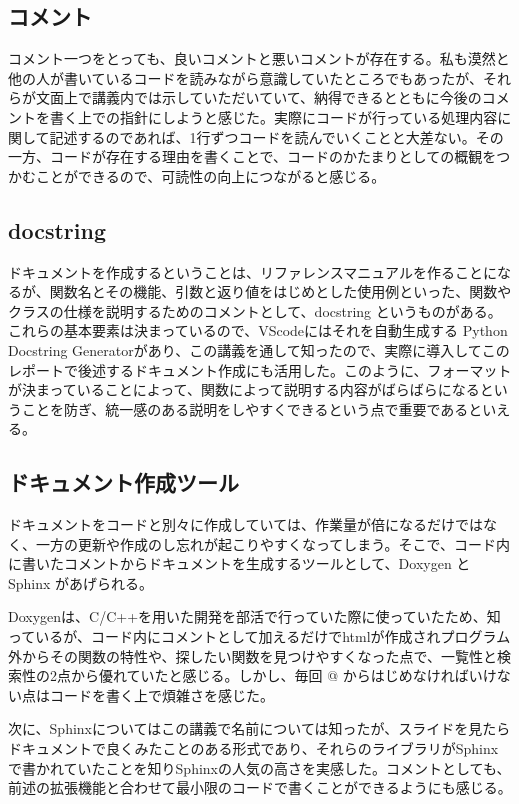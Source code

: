 \documentclass[12pt]{jsarticle}
\begin{document}
\subsection{コメント}
コメント一つをとっても、良いコメントと悪いコメントが存在する。私も漠然と他の人が書いているコードを読みながら意識していたところでもあったが、それらが文面上で講義内では示していただいていて、納得できるとともに今後のコメントを書く上での指針にしようと感じた。実際にコードが行っている処理内容に関して記述するのであれば、1行ずつコードを読んでいくことと大差ない。その一方、コードが存在する理由を書くことで、コードのかたまりとしての概観をつかむことができるので、可読性の向上につながると感じる。

\subsection{docstring}
ドキュメントを作成するということは、リファレンスマニュアルを作ることになるが、関数名とその機能、引数と返り値をはじめとした使用例といった、関数やクラスの仕様を説明するためのコメントとして、docstring というものがある。これらの基本要素は決まっているので、VScodeにはそれを自動生成する Python Docstring Generatorがあり、この講義を通して知ったので、実際に導入してこのレポートで後述するドキュメント作成にも活用した。このように、フォーマットが決まっていることによって、関数によって説明する内容がばらばらになるということを防ぎ、統一感のある説明をしやすくできるという点で重要であるといえる。

\subsection{ドキュメント作成ツール}
ドキュメントをコードと別々に作成していては、作業量が倍になるだけではなく、一方の更新や作成のし忘れが起こりやすくなってしまう。そこで、コード内に書いたコメントからドキュメントを生成するツールとして、Doxygen と Sphinx があげられる。

Doxygenは、C/C++を用いた開発を部活で行っていた際に使っていたため、知っているが、コード内にコメントとして加えるだけでhtmlが作成されプログラム外からその関数の特性や、探したい関数を見つけやすくなった点で、一覧性と検索性の2点から優れていたと感じる。しかし、毎回 @ からはじめなければいけない点はコードを書く上で煩雑さを感じた。

次に、Sphinxについてはこの講義で名前については知ったが、スライドを見たらドキュメントで良くみたことのある形式であり、それらのライブラリがSphinxで書かれていたことを知りSphinxの人気の高さを実感した。コメントとしても、前述の拡張機能と合わせて最小限のコードで書くことができるようにも感じる。
\end{document}
